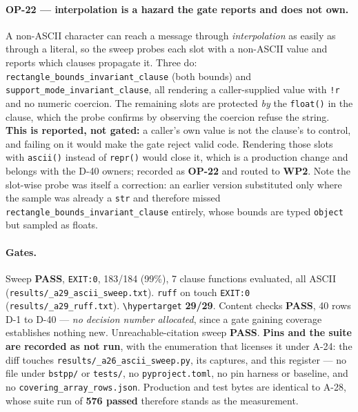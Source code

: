\documentclass[
  10pt,
]{article}
\begin{document}
\paragraph{OP-22 --- interpolation is a hazard the gate reports and does not own.}
A non-ASCII character can reach a message through \emph{interpolation} as easily as through a literal, so the sweep probes each slot with a non-ASCII value and reports which clauses propagate it. Three do: \texttt{rectangle\_bounds\_invariant\_clause} (both bounds) and \texttt{support\_mode\_invariant\_clause}, all rendering a caller-supplied value with \texttt{!r} and no numeric coercion. The remaining slots are protected \emph{by} the \texttt{float()} in the clause, which the probe confirms by observing the coercion refuse the string. \textbf{This is reported, not gated:} a caller's own value is not the clause's to control, and failing on it would make the gate reject valid code. Rendering those slots with \texttt{ascii()} instead of \texttt{repr()} would close it, which is a production change and belongs with the D-40 owners; recorded as \textbf{OP-22} and routed to \textbf{WP2}. Note the slot-wise probe was itself a correction: an earlier version substituted only where the sample was already a \texttt{str} and therefore missed \texttt{rectangle\_bounds\_invariant\_clause} entirely, whose bounds are typed \texttt{object} but sampled as floats.

\paragraph{Gates.}
Sweep \textbf{PASS}, \texttt{EXIT:0}, 183/184 (99\%), 7 clause functions evaluated, all ASCII (\texttt{results/\allowbreak{}\_a29\_ascii\_sweep.txt}). \texttt{ruff} on touch \texttt{EXIT:0} (\texttt{results/\allowbreak{}\_a29\_ruff.txt}). \texttt{\textbackslash hypertarget} \textbf{29/29}. Content checks \textbf{PASS}, 40 rows D-1 to D-40 --- \emph{no decision number allocated}, since a gate gaining coverage establishes nothing new. Unreachable-citation sweep \textbf{PASS}. \textbf{Pins and the suite are recorded as not run}, with the enumeration that licenses it under A-24: the diff touches \texttt{results/\allowbreak{}\_a26\_ascii\_sweep.py}, its captures, and this register --- no file under \texttt{bstpp/} or \texttt{tests/}, no \texttt{pyproject.toml}, no pin harness or baseline, and no \texttt{covering\_array\_rows.json}. Production and test bytes are identical to A-28, whose suite run of \textbf{576 passed} therefore stands as the measurement.
\end{document}
